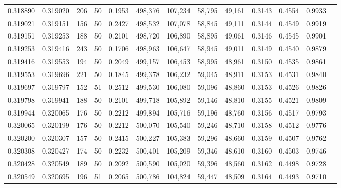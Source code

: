 \begin{tabular}{rrrrrrrrrrrrr}
0.318890 & 0.319020 &   206 &  50 &                                     0.1953 & 498,376 & 107,234 &  58,795 &  49,161 & 0.3143 & 0.4554 & 0.9933 \\
0.319021 & 0.319151 &   156 &  50 &                                     0.2427 & 498,532 & 107,078 &  58,845 &  49,111 & 0.3144 & 0.4549 & 0.9919 \\
0.319151 & 0.319253 &   188 &  50 &                                     0.2101 & 498,720 & 106,890 &  58,895 &  49,061 & 0.3146 & 0.4545 & 0.9901 \\
0.319253 & 0.319416 &   243 &  50 &                                     0.1706 & 498,963 & 106,647 &  58,945 &  49,011 & 0.3149 & 0.4540 & 0.9879 \\
0.319416 & 0.319553 &   194 &  50 &                                     0.2049 & 499,157 & 106,453 &  58,995 &  48,961 & 0.3150 & 0.4535 & 0.9861 \\
0.319553 & 0.319696 &   221 &  50 &                                     0.1845 & 499,378 & 106,232 &  59,045 &  48,911 & 0.3153 & 0.4531 & 0.9840 \\
0.319697 & 0.319797 &   152 &  51 &                                     0.2512 & 499,530 & 106,080 &  59,096 &  48,860 & 0.3153 & 0.4526 & 0.9826 \\
0.319798 & 0.319941 &   188 &  50 &                                     0.2101 & 499,718 & 105,892 &  59,146 &  48,810 & 0.3155 & 0.4521 & 0.9809 \\
0.319944 & 0.320065 &   176 &  50 &                                     0.2212 & 499,894 & 105,716 &  59,196 &  48,760 & 0.3156 & 0.4517 & 0.9793 \\
0.320065 & 0.320199 &   176 &  50 &                                     0.2212 & 500,070 & 105,540 &  59,246 &  48,710 & 0.3158 & 0.4512 & 0.9776 \\
0.320200 & 0.320307 &   157 &  50 &                                     0.2415 & 500,227 & 105,383 &  59,296 &  48,660 & 0.3159 & 0.4507 & 0.9762 \\
0.320308 & 0.320427 &   174 &  50 &                                     0.2232 & 500,401 & 105,209 &  59,346 &  48,610 & 0.3160 & 0.4503 & 0.9746 \\
0.320428 & 0.320549 &   189 &  50 &                                     0.2092 & 500,590 & 105,020 &  59,396 &  48,560 & 0.3162 & 0.4498 & 0.9728 \\
0.320549 & 0.320695 &   196 &  51 &                                     0.2065 & 500,786 & 104,824 &  59,447 &  48,509 & 0.3164 & 0.4493 & 0.9710 \\

\end{tabular}
